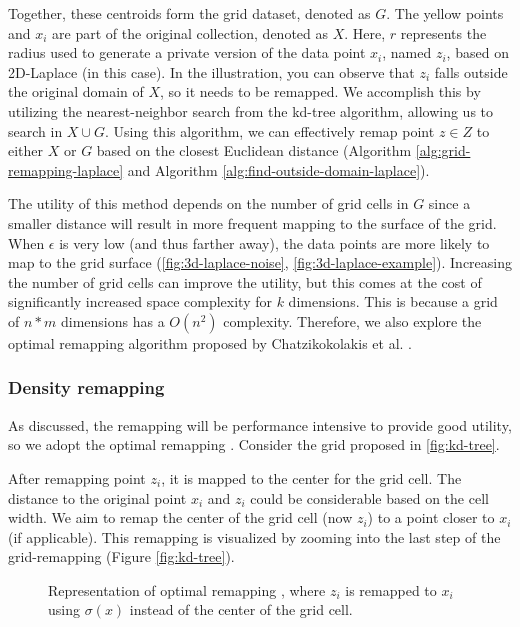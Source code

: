 Together, these centroids form the grid dataset, denoted as $G$.
The yellow points and $x_i$ are part of the original collection, denoted as $X$.
Here, $r$ represents the radius used to generate a private version of the data point $x_i$, named $z_i$, based on 2D-Laplace (in this case).
In the illustration, you can observe that $z_i$ falls outside the original domain of $X$, so it needs to be remapped.
We accomplish this by utilizing the nearest-neighbor search from the kd-tree algorithm, allowing us to search in $X \cup G$.
Using this algorithm, we can effectively remap point $z \in Z$ to either $X$ or $G$ based on the closest Euclidean distance (Algorithm \ref{alg:grid-remapping-laplace} and Algorithm \ref{alg:find-outside-domain-laplace}).

The utility of this method depends on the number of grid cells in $G$ since a smaller distance will result in more frequent mapping to the surface of the grid.
When $\epsilon$ is very low (and thus farther away), the data points are more likely to map to the grid surface (\ref{fig:3d-laplace-noise}, \ref{fig:3d-laplace-example}).
Increasing the number of grid cells can improve the utility, but this comes at the cost of significantly increased space complexity for $k$ dimensions.
This is because a grid of $n*m$ dimensions has a $O(n^2)$ complexity.
Therefore, we also explore the optimal remapping algorithm proposed by Chatzikokolakis et al. \citep{chatzikokolakis_efficient_2017}.



\newpage
\subsubsection{Density remapping} \label{theory:optimal-remapping}
As discussed, the remapping will be performance intensive to provide good utility, so we adopt the optimal remapping \citep{chatzikokolakis_efficient_2017}.
Consider the grid proposed in \ref{fig:kd-tree}.

After remapping point $z_i$, it is mapped to the center for the grid cell.
The distance to the original point $x_i$ and $ z_i$ could be considerable based on the cell width.
We aim to remap the center of the grid cell (now $z_i$) to a point closer to $x_i$ (if applicable). \newline
This remapping is visualized by zooming into the last step of the grid-remapping (Figure \ref{fig:kd-tree}).
\begin{figure}[H]
  
  \caption{Representation of optimal remapping \citep{chatzikokolakis_efficient_2017}, where $z_i$ is remapped to $x_i$ using $\sigma(x)$ instead of the center of the grid cell.}
  \label{fig:optimal-remapping}
\end{figure}

